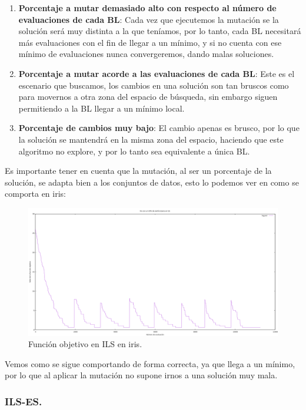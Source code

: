\documentclass[12pt, spanish]{article}
\begin{document}
\begin{enumerate}
	\item \textbf{Porcentaje a mutar demasiado alto con respecto al número de evaluaciones de cada BL}: Cada vez que ejecutemos la mutación se la solución será muy distinta a la que teníamos, por lo tanto, cada BL necesitará más evaluaciones con el fin de llegar a un mínimo, y si no cuenta con ese mínimo de evaluaciones nunca convergeremos, dando malas soluciones.
	\item \textbf{Porcentaje a mutar acorde a las evaluaciones de cada BL}: Este es el escenario que buscamos, los cambios en una solución son tan bruscos como para movernos a otra zona del espacio de búsqueda, sin embargo siguen permitiendo a la BL llegar a un mínimo local.
	\item \textbf{Porcentaje de cambios muy bajo}: El cambio apenas es brusco, por lo que la solución se mantendrá en la misma zona del espacio, haciendo que este algoritmo no explore, y por lo tanto sea equivalente a única BL.
\end{enumerate}


Es importante tener en cuenta que la mutación, al ser un porcentaje de la solución, se adapta bien a los conjuntos de datos, esto lo podemos ver en como se comporta en iris:

\begin{figure}[H]
	\centering
	\includegraphics[scale = 0.35]{iris-ils.png}
	
	\caption{Función objetivo en ILS en iris.}
	\label{fig:ils-cmp2}
\end{figure}

Vemos como se sigue comportando de forma correcta, ya que llega a un mínimo, por lo que al aplicar la mutación no supone irnos a una solución muy mala.

\subsubsection{ILS-ES.}
\end{document}
